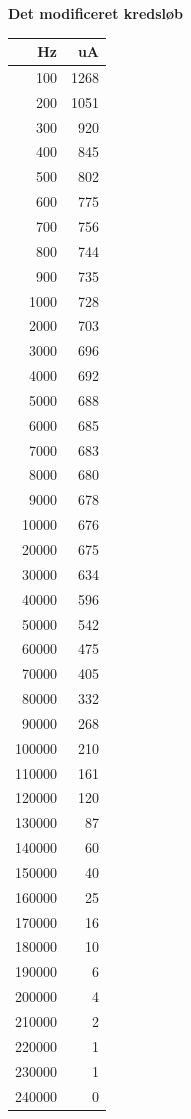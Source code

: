 \textbf{Det modificeret kredsløb}\\

\begin{table}[H]
\begin{minipage}[b]{0.30\linewidth}
\centering
\begin{tabular}{ r |  r }
    \hline
    Hz & uA \\ \hline
    100 & 1268 \\ \hline
    200 & 1051 \\ \hline
    300 & 920 \\ \hline
    400 & 845 \\ \hline
    500 & 802 \\ \hline
    600 & 775 \\ \hline
    700 & 756 \\ \hline
    800 & 744 \\ \hline
    900 & 735 \\ \hline
    1000 & 728 \\ \hline
    2000 & 703 \\ \hline
    3000 & 696 \\ \hline
    4000 & 692 \\ \hline
    5000 & 688 \\ \hline
    6000 & 685 \\ \hline
    7000 & 683 \\ \hline
    8000 & 680 \\ \hline
    9000 & 678 \\ \hline
    10000 & 676 \\ \hline
    20000 & 675 \\ \hline
    30000 & 634 \\ \hline
    40000 & 596 \\ \hline
    50000 & 542 \\ \hline
    60000 & 475 \\ \hline
    70000 & 405 \\ \hline
    80000 & 332 \\ \hline
    90000 & 268 \\ \hline
    100000 & 210 \\ \hline
    110000 & 161 \\ \hline
    120000 & 120 \\ \hline
    130000 & 87 \\ \hline
    140000 & 60 \\ \hline
    150000 & 40 \\ \hline
    160000 & 25 \\ \hline
    170000 & 16 \\ \hline
    180000 & 10 \\ \hline
    190000 & 6 \\ \hline
    200000 & 4 \\ \hline
    210000 & 2 \\ \hline
    220000 & 1 \\ \hline
    230000 & 1 \\ \hline
    240000 & 0 \\ \hline
        

\end{tabular}
\end{minipage}
\end{table}
